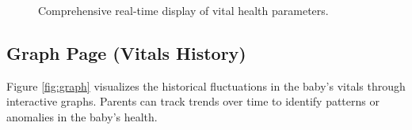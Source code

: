 \documentclass[12pt,a4paper]{report}
\begin{document}
\begin{figure}[htbp]
  
  
  \caption{Comprehensive real-time display of vital health parameters.}
    \label{fig:dashboard}
\end{figure}
\subsection{Graph Page (Vitals History)}
Figure \ref{fig:graph} visualizes the historical fluctuations in the baby’s vitals through interactive graphs. Parents can track trends over time to identify patterns or anomalies in the baby's health.
\end{document}
